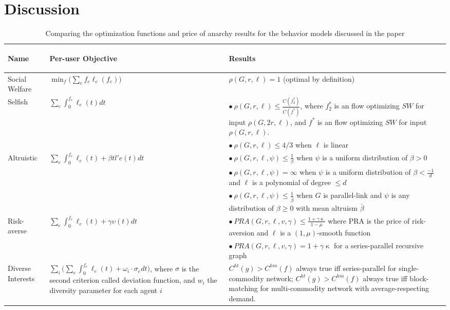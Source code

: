 \section{Discussion}\label{sec:discussion}

\begin{table}[h]
\begin{center}
    \begin{tabular}{|p{2cm}| p{6cm} | p{7cm}|} 
 \hline
        \begin{center}Name\end{center} & \begin{center}Per-user Objective\end{center} & \begin{center} Results\end{center} \\
 \hline\hline
        Social Welfare & $\min_f\Big(\sum_e f_e\ell_e(f_e)\Big)$ & $\rho(G,r,\ell) = 1$ (optimal by definition) \\
 \hline
     Selfish & $\sum_e\int_0^{f_e} \ell_e(t)dt$ & 
        $\bullet~\rho(G,r,\ell) \le \frac{C(f^*_2)}{C(f^*)}$, where $f^*_2$ is an flow optimizing $SW$ for input $\rho(G,2r,\ell)$, and $f^*$ is an flow optimizing $SW$ for input $\rho(G,r,\ell)$.\\ 
        &  & $\bullet~\rho(G,r,\ell) \le 4/3$ when $\ell$ is linear\\
 \hline
        Altruistic & $\sum_e\int_0^{f_e} \ell_e(t) + \beta tl'e(t)dt$ & 
        $\bullet~\rho(G,r,\ell,\psi) \le \frac{1}{\beta}$ when $\psi$ is a uniform distribution of $\beta >0$\\
        & & $\bullet~\rho(G,r,\ell,\psi) = \infty$ when $\psi$ is a uniform distribution of $\beta < \frac{-1}{d}$ and $\ell$ is a polynomial of degree $\le d$\\
        & & $\bullet~\rho(G,r,\ell,\psi) \le \frac{1}{\bar{\beta}}$ when $G$ is parallel-link and $\psi$ is any distribution of $\beta \ge 0$ with mean altruism $\bar{\beta}$\\
\hline
     Risk-averse & $\sum_e\int_0^{f_e} \ell_e(t) + \gamma\upsilon(t)dt$ & 
    $\bullet~PRA(G,r,\ell,v,\gamma) \leq \frac{1 + \gamma\upkappa}{1 - \mu}$ where PRA is the price of risk-aversion and $\ell$ is a $(1,\mu)$-smooth function\\
    & & $\bullet~PRA(G,r,\ell,v,\gamma) = 1 + \gamma\upkappa $ for a series-parallel recursive graph\\
\hline
     Diverse Interests & $\sum_i \big(\sum_e\int_0^{f_e} \ell_e(t) + \omega_i\cdot \sigma_e dt\big)$, where $\sigma$ is the second criterion called deviation function, and $w_i$ the diversity parameter for each agent $i$ & $C^{ht}(g)> C^{hm}(f)$ always true iff series-parallel for single-commodity network; $C^{ht}(g)> C^{hm}(f)$ always true iff block-matching for multi-commodity network with average-respecting demand.\\
\hline
\end{tabular}
\end{center}
    \caption{Comparing the optimization functions and price of anarchy results for the behavior models discussed in the paper}
    \label{tab:comparison}
\end{table}

